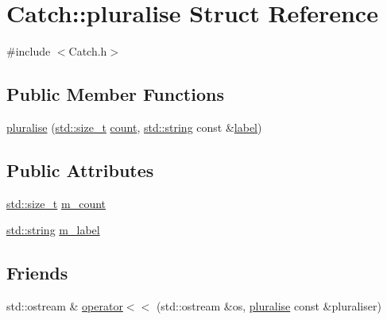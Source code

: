 \hypertarget{struct_catch_1_1pluralise}{}\section{Catch\+:\+:pluralise Struct Reference}
\label{struct_catch_1_1pluralise}


{\ttfamily \#include $<$Catch.\+h$>$}

\subsection*{Public Member Functions}
\begin{DoxyCompactItemize}
\item 
\hyperlink{struct_catch_1_1pluralise_a5c55e22de2416cfe416edf715c6b9234}{pluralise} (\hyperlink{_s_d_l__config_8h_a7c94ea6f8948649f8d181ae55911eeaf}{std\+::size\+\_\+t} \hyperlink{_s_d_l__opengl_8h_a619bc20e8198de3bd3f3d7fc34de66b2}{count}, \hyperlink{_s_d_l__opengl__glext_8h_ae84541b4f3d8e1ea24ec0f466a8c568b}{std\+::string} const \&\hyperlink{_s_d_l__opengl__glext_8h_a9371a1f53f8067997cd15aaf657c62d0}{label})
\end{DoxyCompactItemize}
\subsection*{Public Attributes}
\begin{DoxyCompactItemize}
\item 
\hyperlink{_s_d_l__config_8h_a7c94ea6f8948649f8d181ae55911eeaf}{std\+::size\+\_\+t} \hyperlink{struct_catch_1_1pluralise_a4dce2fa13ec6f00fac09b2418265441e}{m\+\_\+count}
\item 
\hyperlink{_s_d_l__opengl__glext_8h_ae84541b4f3d8e1ea24ec0f466a8c568b}{std\+::string} \hyperlink{struct_catch_1_1pluralise_a8849cbdd3f11ebe7747597c8644e8793}{m\+\_\+label}
\end{DoxyCompactItemize}
\subsection*{Friends}
\begin{DoxyCompactItemize}
\item 
std\+::ostream \& \hyperlink{struct_catch_1_1pluralise_aa7dac6b165514c1f85e0695d678fdef5}{operator$<$$<$} (std\+::ostream \&os, \hyperlink{struct_catch_1_1pluralise}{pluralise} const \&pluraliser)
\end{DoxyCompactItemize}



